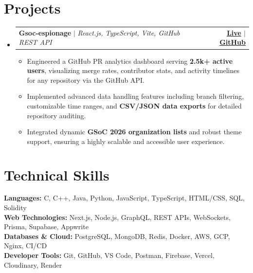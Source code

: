 \documentclass[letterpaper,11pt]{article}
\makeatletter
\newcommand{\resumeItem}[1]{
  \item\small{
    {#1 \vspace{-2pt}}
  }
}
\newcommand{\resumeProjectHeading}[2]{
    \item
    \begin{tabular*}{1.001\textwidth}{l@{\extracolsep{\fill}}r}
      \small#1 & \textbf{\small #2}\\
    \end{tabular*}\vspace{-7pt}
}
\newcommand{\resumeSubHeadingListStart}{\begin{itemize}[leftmargin=0.0in, label={}]}
\newcommand{\resumeSubHeadingListEnd}{\end{itemize}}
\newcommand{\resumeItemListStart}{\begin{itemize}[itemsep=-2pt]}
\newcommand{\resumeItemListEnd}{\end{itemize}\vspace{-5pt}}
\makeatother
\begin{document}
\section{Projects}
  \resumeSubHeadingListStart
    \resumeProjectHeading
      {\textbf{Gsoc-espionage} $|$ \emph{React.js, TypeScript, Vite, GitHub REST API}}{\href{https://gsoc.app/}{\textbf{Live}} $|$ \href{https://github.com/Adshkumar/Gsoc-espionage}{\textbf{GitHub}}}
      \resumeItemListStart
        \resumeItem{Engineered a GitHub PR analytics dashboard serving \textbf{2.5k+ active users}, visualizing merge rates, contributor stats, and activity timelines for any repository via the GitHub API.}
        \resumeItem{Implemented advanced data handling features including branch filtering, customizable time ranges, and \textbf{CSV/JSON data exports} for detailed repository auditing.}
        \resumeItem{Integrated dynamic \textbf{GSoC 2026 organization lists} and robust theme support, ensuring a highly scalable and accessible user experience.}
      \resumeItemListEnd

  \resumeSubHeadingListEnd

\section{Technical Skills}
 \begin{itemize}[leftmargin=0.15in, label={}]
    \small{\item{
     \textbf{Languages:} C, C++, Java, Python, JavaScript, TypeScript, HTML/CSS, SQL, Solidity \\
     \textbf{Web Technologies:} Next.js, Node.js, GraphQL, REST APIs, WebSockets, Prisma, Supabase, Appwrite \\
     \textbf{Databases \& Cloud:} PostgreSQL, MongoDB, Redis, Docker, AWS, GCP, Nginx, CI/CD \\
     \textbf{Developer Tools:} Git, GitHub, VS Code, Postman, Firebase, Vercel, Cloudinary, Render
    }}
 \end{itemize}
\end{document}
